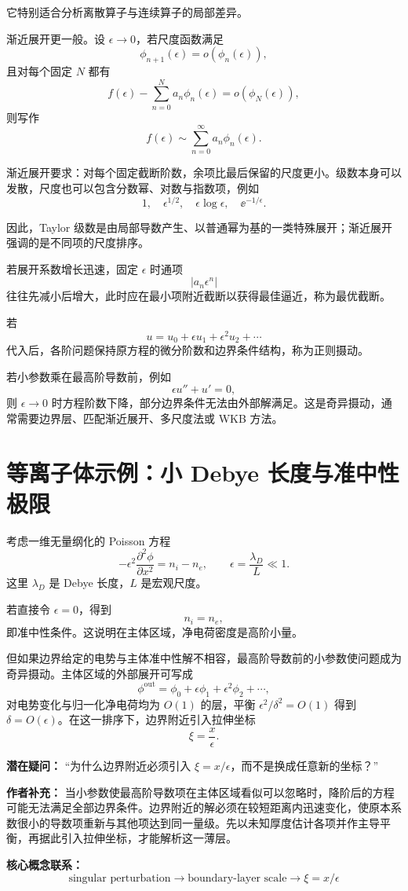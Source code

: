 它特别适合分析离散算子与连续算子的局部差异。

渐近展开更一般。设 \(\epsilon\to0\)，若尺度函数满足
\[
\phi_{n+1}(\epsilon)=o(\phi_n(\epsilon)),
\]
且对每个固定 \(N\) 都有
\[
f(\epsilon)
-
\sum_{n=0}^{N}a_n\phi_n(\epsilon)
=
o(\phi_N(\epsilon)),
\]
则写作
\[
f(\epsilon)\sim\sum_{n=0}^{\infty}a_n\phi_n(\epsilon).
\]

渐近展开要求：对每个固定截断阶数，余项比最后保留的尺度更小。级数本身可以发散，尺度也可以包含分数幂、对数与指数项，例如
\[
1,\quad
\epsilon^{1/2},\quad
\epsilon\log\epsilon,\quad
\ee^{-1/\epsilon}.
\]

因此，Taylor 级数是由局部导数产生、以普通幂为基的一类特殊展开；渐近展开强调的是不同项的尺度排序。

若展开系数增长迅速，固定 \(\epsilon\) 时通项
\[
|a_n\epsilon^n|
\]
往往先减小后增大，此时应在最小项附近截断以获得最佳逼近，称为最优截断。

若
\[
u=u_0+\epsilon u_1+\epsilon^2u_2+\cdots
\]
代入后，各阶问题保持原方程的微分阶数和边界条件结构，称为正则摄动。

若小参数乘在最高阶导数前，例如
\[
\epsilon u''+u'=0,
\]
则 \(\epsilon\to0\) 时方程阶数下降，部分边界条件无法由外部解满足。这是奇异摄动，通常需要边界层、匹配渐近展开、多尺度法或 WKB 方法。

\section{等离子体示例：小 Debye 长度与准中性极限}

考虑一维无量纲化的 Poisson 方程
\[
-\epsilon^2\frac{\partial^2\phi}{\partial x^2}
=
n_i-n_e,
\qquad
\epsilon=\frac{\lambda_D}{L}\ll1.
\]
这里 \(\lambda_D\) 是 Debye 长度，\(L\) 是宏观尺度。

若直接令 \(\epsilon=0\)，得到
\[
n_i=n_e,
\]
即准中性条件。这说明在主体区域，净电荷密度是高阶小量。

但如果边界给定的电势与主体准中性解不相容，最高阶导数前的小参数使问题成为奇异摄动。主体区域的外部展开可写成
\[
\phi^{\mathrm{out}}
=
\phi_0+\epsilon\phi_1+\epsilon^2\phi_2+\cdots,
\]
对电势变化与归一化净电荷均为 $O(1)$ 的层，平衡 $\epsilon^2/\delta^2=O(1)$ 得到 $\delta=O(\epsilon)$。在这一排序下，边界附近引入拉伸坐标
\[
\xi=\frac{x}{\epsilon}.
\]

\begin{authornote}
\textbf{潜在疑问：}
“为什么边界附近必须引入 \(\xi=x/\epsilon\)，而不是换成任意新的坐标？”

\textbf{作者补充：}
当小参数使最高阶导数项在主体区域看似可以忽略时，降阶后的方程可能无法满足全部边界条件。边界附近的解必须在较短距离内迅速变化，使原本系数很小的导数项重新与其他项达到同一量级。先以未知厚度估计各项并作主导平衡，再据此引入拉伸坐标，才能解析这一薄层。

\textbf{核心概念联系：}
\[
\text{singular perturbation}
\longrightarrow
\text{boundary-layer scale}
\longrightarrow
\xi=x/\epsilon
\]
\end{authornote}

